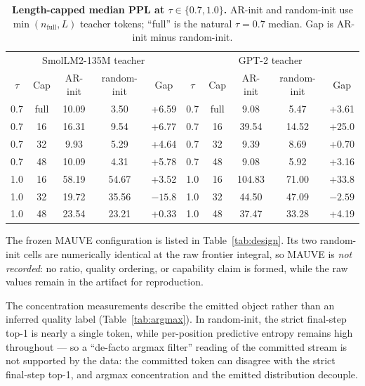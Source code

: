 \documentclass{article}
\newcommand{\armA}{AR-init}
\newcommand{\armB}{random-init}
\begin{document}
\begin{table}[!t]
  \caption{\textbf{Length-capped median PPL at $\tau\in\{0.7,1.0\}$.} \armA{}
  and \armB{} use $\min(n_{\mathrm{full}},L)$ teacher tokens; ``full'' is the
  natural $\tau=0.7$ median.  Gap is \armA{} minus \armB{}.}
  \label{tab:lenmatch}
  \centering
  \footnotesize
  \setlength{\tabcolsep}{3.5pt}
  \begin{tabular}{@{}ccccc@{\qquad}ccccc@{}}
    \toprule
    \multicolumn{5}{c}{SmolLM2-135M teacher} &
    \multicolumn{5}{c}{GPT-2 teacher} \\
    $\tau$ & Cap & \armA{} & \armB{} & Gap & $\tau$ & Cap & \armA{} & \armB{} & Gap \\
    \midrule
    0.7 & full & 10.09 & 3.50 & +6.59 & 0.7 & full & 9.08 & 5.47 & +3.61 \\
    0.7 & 16 & 16.31 & 9.54 & +6.77 & 0.7 & 16 & 39.54 & 14.52 & +25.0 \\
    0.7 & 32 & 9.93 & 5.29 & +4.64 & 0.7 & 32 & 9.39 & 8.69 & +0.70 \\
    0.7 & 48 & 10.09 & 4.31 & +5.78 & 0.7 & 48 & 9.08 & 5.92 & +3.16 \\
    1.0 & 16 & 58.19 & 54.67 & +3.52 & 1.0 & 16 & 104.83 & 71.00 & +33.8 \\
    1.0 & 32 & 19.72 & 35.56 & $-15.8$ & 1.0 & 32 & 44.50 & 47.09 & $-2.59$ \\
    1.0 & 48 & 23.54 & 23.21 & +0.33 & 1.0 & 48 & 37.47 & 33.28 & +4.19 \\
    \bottomrule
  \end{tabular}
\end{table}

The frozen MAUVE configuration is listed in Table~\ref{tab:design}.  Its two
\armB{} cells are numerically identical at the raw frontier integral, so MAUVE
is \emph{not recorded}: no ratio, quality ordering, or capability claim is
formed, while the raw values remain in the artifact for reproduction.

The concentration measurements describe the emitted object rather than an
inferred quality label (Table~\ref{tab:argmax}).  In \armB{}, the strict
final-step top-1 is nearly a single token, while per-position predictive
entropy remains high throughout --- so a ``de-facto argmax filter'' reading
of the committed stream is not supported by the data: the committed token can
disagree with the strict final-step top-1, and argmax concentration and the
emitted distribution decouple.
\end{document}
